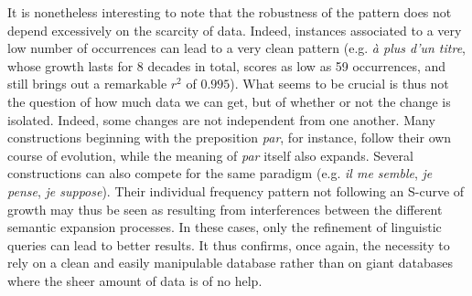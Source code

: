 \documentclass[12pt,twocolumn,amsmath,amssymb,aps,longbibliography]{revtex4-1}  %
\newcommand{\tit}{\textit}
\begin{document}
{{It is nonetheless interesting to note that the robustness of the pattern does not depend excessively on the scarcity of data. Indeed, instances associated to a very low number of occurrences can lead to a very clean pattern (e.g. \tit{\`a plus d'un titre}, whose growth lasts for 8 decades in total, scores as low as 59 occurrences, and still brings out a remarkable $r^2$ of $0.995$). What seems to be crucial is thus not the question of how much data we can get, but of whether or not the change is isolated. Indeed, some changes are not independent from one another. Many constructions beginning with the preposition \tit{par}, for instance, follow their own course of evolution, while the meaning of \tit{par} itself also expands. Several constructions can also compete for the same paradigm (e.g. \tit{il me semble}, \tit{je pense}, \tit{je suppose}). Their individual frequency pattern not following an S-curve of growth may thus be seen as resulting from interferences between the different semantic expansion processes. In these cases, only the refinement of linguistic queries can lead to better results. It thus confirms, once again, the necessity to rely on a clean and easily manipulable database rather than on giant databases where the sheer amount of data is of no help. 



\newpage




\setcounter{table}{0}

\tabletail{ \hline}
\tablelasttail{\hline}


}}
\end{document}
